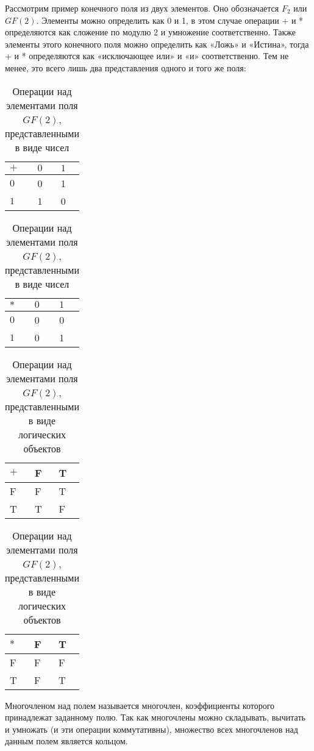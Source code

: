 Рассмотрим пример конечного поля из двух элементов. Оно обозначается \(F_2\) или \(GF(2)\). Элементы можно определить как 0 и 1, в этом случае операции + и * определяются как сложение по модулю 2 и умножение соответственно. Также элементы этого конечного поля можно определить как «Ложь» и «Истина», тогда + и * определяются как «исключающее или» и «и» соответственно. Тем не менее, это всего лишь два представления одного и того же поля:

\begin{table} [htbp]
		\centering\small
\caption{Операции над элементами поля \(GF(2)\), представленными в виде чисел}%
	\label{tab:ToyCompare}		
\begin{tabular}{|l|l|l|}
	\hline
	$+$&$0$&$1$\\
	\hline
	$0$&0&1\\
	$1$&1&0\\ \hline
\end{tabular}
\begin{tabular}{|l|l|l|}
	\hline
	$*$&$0$&$1$\\
	\hline
	$0$&0&0\\
	$1$&0&1\\ \hline
\end{tabular}
	\normalsize%
\end{table}


\begin{table} [htbp]
	\centering\small
	\caption{Операции над элементами поля \(GF(2)\), представленными в виде логических объектов}%
	\label{tab:ToyCompare}		
	\begin{tabular}{|l|l|l|}
		\hline
		$+$&F&T\\
		\hline
		F&F&T\\
		T&T&F\\ \hline
	\end{tabular}
	\begin{tabular}{|l|l|l|}
		\hline
		$*$&F&T\\
		\hline
		F&F&F\\
		T&F&T\\ \hline
	\end{tabular}
	\normalsize%
\end{table}


Многочленом над полем называется многочлен, коэффициенты которого принадлежат заданному полю. Так как многочлены можно складывать, вычитать и умножать (и эти операции коммутативны), множество всех многочленов над данным полем является кольцом.

